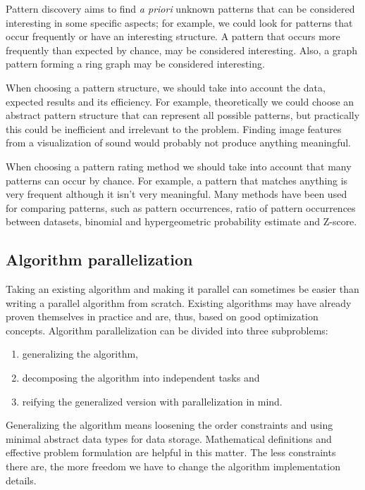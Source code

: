 Pattern discovery aims to find \emph{a priori} unknown patterns that can be considered interesting in some specific aspects; for example, we could look for patterns that occur frequently or have an interesting structure. A pattern that occurs more frequently than expected by chance, may be considered interesting. Also, a graph pattern forming a ring graph may be considered interesting.

When choosing a pattern structure, we should take into account the data, expected results and its efficiency. For example, theoretically we could choose an abstract pattern structure that can represent all possible patterns, but practically this could be inefficient and irrelevant to the problem. Finding image features from a visualization of sound would probably not produce anything meaningful.

When choosing a pattern rating method we should take into account that many patterns can occur by chance. For example, a pattern that matches anything is very frequent although it isn't very meaningful. Many methods have been used for comparing patterns, such as pattern occurrences, ratio of pattern occurrences between datasets, binomial and hypergeometric probability estimate and Z-score.

\subsection{Algorithm parallelization}

Taking an existing algorithm and making it parallel can sometimes be easier than writing a parallel algorithm from scratch. Existing algorithms may have already proven themselves in practice and are, thus, based on good optimization concepts. Algorithm parallelization can be divided into three subproblems:

\begin{enumerate}
	\item generalizing the algorithm,
	\item decomposing the algorithm into independent tasks and
	\item reifying the generalized version with parallelization in mind.
\end{enumerate}

Generalizing the algorithm means loosening the order constraints and using minimal abstract data types for data storage. Mathematical definitions and effective problem formulation are helpful in this matter. The less constraints there are, the more freedom we have to change the algorithm implementation details.

